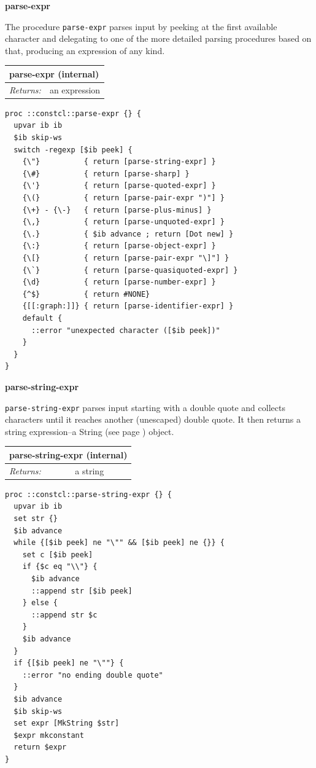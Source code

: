 \documentclass[twoside,9pt]{report}
\begin{document}
\textbf{parse-expr}


The procedure \texttt{parse-expr} parses input by peeking at the first available character and delegating to one of the more detailed parsing procedures based on that, producing an expression of any kind.

\begin{tabular}{ |l l| }
\hline
\multicolumn{2}{|l|}{parse-expr (internal)} \\
\hline
\textit{Returns:} & an expression \\
\hline
\end{tabular}

\noindent\makebox[\linewidth]{\rule{\linewidth}{0.4pt}}
\begin{lstlisting}
proc ::constcl::parse-expr {} {
  upvar ib ib
  $ib skip-ws
  switch -regexp [$ib peek] {
    {\"}          { return [parse-string-expr] }
    {\#}          { return [parse-sharp] }
    {\'}          { return [parse-quoted-expr] }
    {\(}          { return [parse-pair-expr ")"] }
    {\+} - {\-}   { return [parse-plus-minus] }
    {\,}          { return [parse-unquoted-expr] }
    {\.}          { $ib advance ; return [Dot new] }
    {\:}          { return [parse-object-expr] }
    {\[}          { return [parse-pair-expr "\]"] }
    {\`}          { return [parse-quasiquoted-expr] }
    {\d}          { return [parse-number-expr] }
    {^$}          { return #NONE}
    {[[:graph:]]} { return [parse-identifier-expr] }
    default {
      ::error "unexpected character ([$ib peek])"
    }
  }
}
\end{lstlisting}
\noindent\makebox[\linewidth]{\rule{\linewidth}{0.4pt}}

\textbf{parse-string-expr}


\texttt{parse-string-expr} parses input starting with a double quote and collects characters until it reaches another (unescaped) double quote. It then returns a string expression--a String (see page \pageref{strings}) object.

\begin{tabular}{ |l l| }
\hline
\multicolumn{2}{|l|}{parse-string-expr (internal)} \\
\hline
\textit{Returns:} & a string \\
\hline
\end{tabular}

\noindent\makebox[\linewidth]{\rule{\linewidth}{0.4pt}}
\begin{lstlisting}
proc ::constcl::parse-string-expr {} {
  upvar ib ib
  set str {}
  $ib advance
  while {[$ib peek] ne "\"" && [$ib peek] ne {}} {
    set c [$ib peek]
    if {$c eq "\\"} {
      $ib advance
      ::append str [$ib peek]
    } else {
      ::append str $c
    }
    $ib advance
  }
  if {[$ib peek] ne "\""} {
    ::error "no ending double quote"
  }
  $ib advance
  $ib skip-ws
  set expr [MkString $str]
  $expr mkconstant
  return $expr
}
\end{lstlisting}
\noindent\makebox[\linewidth]{\rule{\linewidth}{0.4pt}}
\end{document}
